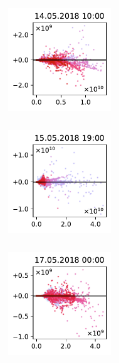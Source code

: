 \begin{figure}[H]
    \centering
    \begin{subfigure}
        \centering
        \includegraphics[width=0.30\textwidth,valign=t]{evaluation/figures/perturbations/perturbation-14.05.2018:10.00-anthropogenic-mul-1.5.pdf}
    \end{subfigure}
    \begin{subfigure}
        \centering
        \includegraphics[width=0.30\textwidth,valign=t]{evaluation/figures/perturbations/perturbation-15.05.2018:19.00-anthropogenic-mul-1.5.pdf}
    \end{subfigure}
    \begin{subfigure}
        \centering
        \includegraphics[width=0.30\textwidth,valign=t]{evaluation/figures/perturbations/perturbation-17.05.2018:00.00-anthropogenic-mul-1.5.pdf}
    \end{subfigure}


\end{figure}
